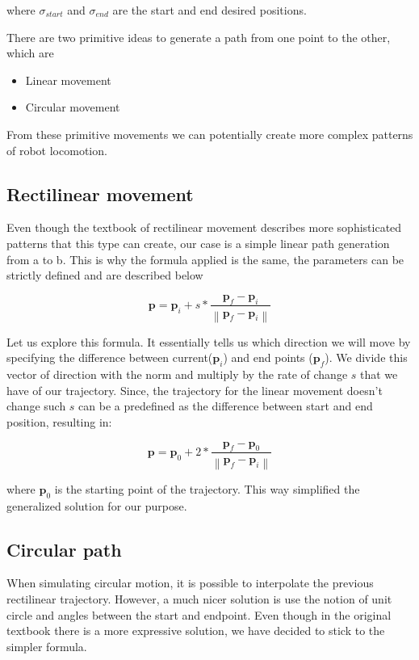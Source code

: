 where $\sigma_{start}$ and $\sigma_{end}$ are the start and end desired positions. 
\break

There are two primitive ideas to generate a path from one point to the other, which are 
\begin{itemize}
\item Linear movement  
\item Circular movement  
\end{itemize}

From these primitive movements we can potentially create more complex patterns of robot locomotion.

\subsection{Rectilinear movement} 
Even though the textbook of rectilinear movement describes more sophisticated patterns that this type can create, our case is a simple linear path generation from a to b. This is why the formula applied is the same, the parameters can be strictly defined and are described below

\[
\textbf{p} = \textbf{p}_i + s * \frac{ \textbf{p}_f - \textbf{p}_i }{ 
\left\| \textbf{p}_f - \textbf{p}_i \right\| }
\]

Let us explore this formula. It essentially tells us which direction we will move by specifying the difference between current($\textbf{p}_i$) and end points ($\textbf{p}_f$). We divide this vector of direction with the norm and multiply by the rate of change $s$ that we have of our trajectory. Since, the trajectory for the linear movement doesn't change such $s$ can be a predefined as the difference between start and end position, resulting in:

\[
\textbf{p} = \textbf{p}_0 + 2 * \frac{ \textbf{p}_f - \textbf{p}_0 }{ 
\left\| \textbf{p}_f - \textbf{p}_i \right\| }
\]

where $\textbf{p}_0$ is the starting point of the trajectory. This way simplified the generalized solution for our purpose.

\subsection{Circular path}

When simulating circular motion, it is possible to interpolate the previous rectilinear trajectory. However, a much nicer solution is use the notion of unit circle and angles between the start and endpoint. Even though in the original textbook \parencite{robotics_book} there is a  more expressive solution, we have decided to stick to the simpler formula. 

